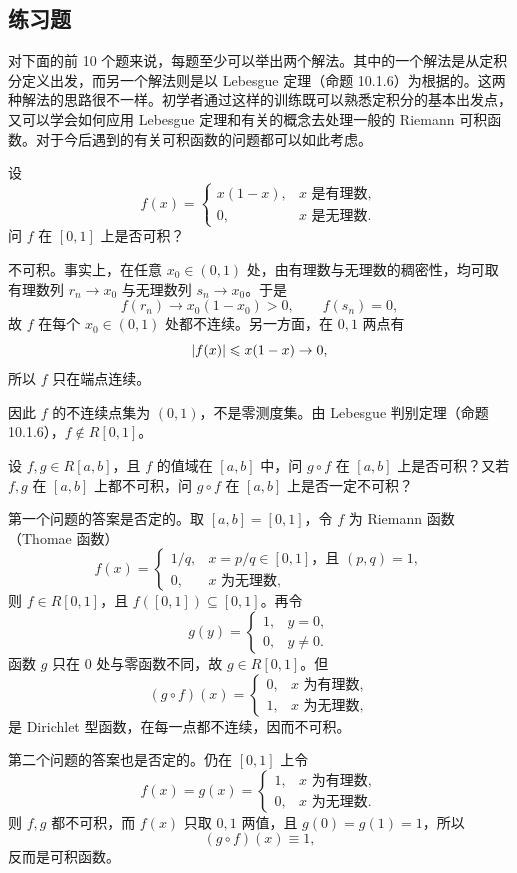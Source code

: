 \subsection{练习题}

对下面的前 10 个题来说，每题至少可以举出两个解法。其中的一个解法是从定积分定义出发，而另一个解法则是以 Lebesgue 定理（命题 10.1.6）为根据的。这两种解法的思路很不一样。初学者通过这样的训练既可以熟悉定积分的基本出发点，又可以学会如何应用 Lebesgue 定理和有关的概念去处理一般的 Riemann 可积函数。对于今后遇到的有关可积函数的问题都可以如此考虑。

\begin{xexercise}[1]
设
\[
  f(x)=
  \begin{cases}
    x(1-x),&x\text{ 是有理数},\\
    0,&x\text{ 是无理数}.
  \end{cases}
\]
问 $f$ 在 $[0,1]$ 上是否可积？
\end{xexercise}
\begin{xsolution}
不可积。事实上，在任意 $x_0\in(0,1)$ 处，由有理数与无理数的稠密性，均可取有理数列 $r_n\to x_0$ 与无理数列 $s_n\to x_0$。于是
\[
  f(r_n)\to x_0(1-x_0)>0,
  \qquad
  f(s_n)=0,
\]
故 $f$ 在每个 $x_0\in(0,1)$ 处都不连续。另一方面，在 $0,1$ 两点有
\[
  \lvert f(x)\rvert\leqslant x(1-x)\to0,
\]
所以 $f$ 只在端点连续。

因此 $f$ 的不连续点集为 $(0,1)$，不是零测度集。由 Lebesgue 判别定理（命题 10.1.6），$f\notin R[0,1]$。
\end{xsolution}


\begin{xexercise}[2]
设 $f,g\in R[a,b]$，且 $f$ 的值域在 $[a,b]$ 中，问 $g\circ f$ 在 $[a,b]$ 上是否可积？又若 $f,g$ 在 $[a,b]$ 上都不可积，问 $g\circ f$ 在 $[a,b]$ 上是否一定不可积？
\end{xexercise}
\begin{xsolution}
第一个问题的答案是否定的。取 $[a,b]=[0,1]$，令 $f$ 为 Riemann 函数（Thomae 函数）
\[
  f(x)=
  \begin{cases}
    1/q,&x=p/q\in[0,1]\text{，且 }(p,q)=1,\\
    0,&x\text{ 为无理数},
  \end{cases}
\]
则 $f\in R[0,1]$，且 $f([0,1])\subseteq[0,1]$。再令
\[
  g(y)=
  \begin{cases}
    1,&y=0,\\
    0,&y\ne0.
  \end{cases}
\]
函数 $g$ 只在 $0$ 处与零函数不同，故 $g\in R[0,1]$。但
\[
  (g\circ f)(x)=
  \begin{cases}
    0,&x\text{ 为有理数},\\
    1,&x\text{ 为无理数},
  \end{cases}
\]
是 Dirichlet 型函数，在每一点都不连续，因而不可积。

第二个问题的答案也是否定的。仍在 $[0,1]$ 上令
\[
  f(x)=g(x)=
  \begin{cases}
    1,&x\text{ 为有理数},\\
    0,&x\text{ 为无理数}.
  \end{cases}
\]
则 $f,g$ 都不可积，而 $f(x)$ 只取 $0,1$ 两值，且 $g(0)=g(1)=1$，所以
\[
  (g\circ f)(x)\equiv1,
\]
反而是可积函数。
\end{xsolution}


